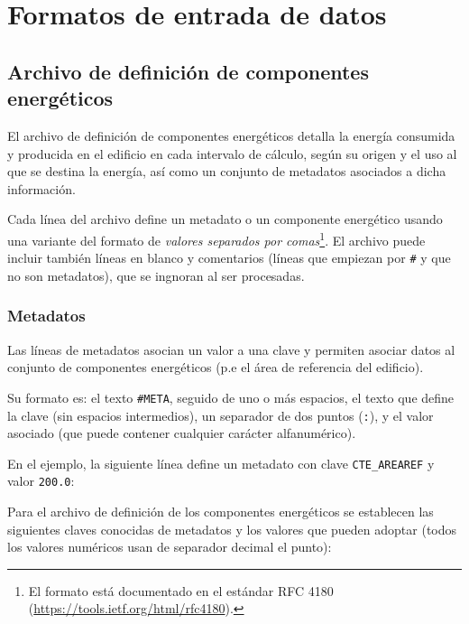 \documentclass[10pt,notitlepage,oneside,a4paper]{article}
\begin{document}
\clearpage
\newpage
\section{Formatos de entrada de datos}

\subsection{Archivo de definición de componentes energéticos}\label{sec:formatocomponentes}

El archivo de definición de componentes energéticos detalla la energía consumida y producida en el edificio en cada intervalo de cálculo, según su origen y el uso al que se destina la energía, así como un conjunto de metadatos asociados a dicha información.

Cada línea del archivo define un metadato o un componente energético usando una variante del formato de \textit{valores separados por comas}\footnote{El formato está documentado en el estándar RFC 4180 (\url{https://tools.ietf.org/html/rfc4180}).}. El archivo puede incluir también líneas en blanco y comentarios (líneas que empiezan por \texttt{\#} y que no son metadatos), que se ingnoran al ser procesadas.



\subsubsection{Metadatos}

Las líneas de metadatos asocian un valor a una clave y permiten asociar datos al conjunto de componentes energéticos (p.e el área de referencia del edificio).

Su formato es: el texto \texttt{\#META}, seguido de uno o más espacios, el texto que define la clave (sin espacios intermedios), un separador de dos puntos (\texttt{:}), y el valor asociado (que puede contener cualquier carácter alfanumérico).

En el ejemplo, la siguiente línea define un metadato con clave \texttt{CTE\_AREAREF} y valor \texttt{200.0}:



Para el archivo de definición de los componentes energéticos se establecen las siguientes claves conocidas de metadatos y los valores que pueden adoptar (todos los valores numéricos usan de separador decimal el punto):
\end{document}
